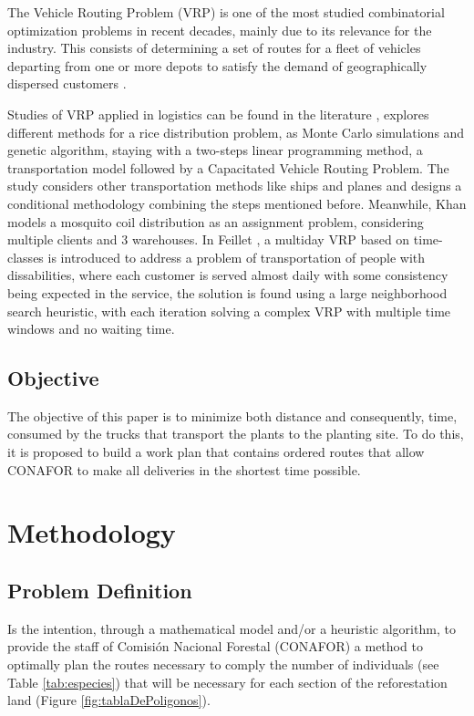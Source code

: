 \documentclass{amsart}
\begin{document}
         The Vehicle Routing Problem (VRP) is one of the most studied combinatorial optimization problems in recent decades, mainly due to its relevance for the industry. This consists of determining a set of routes for a fleet of vehicles departing from one or more depots to satisfy the demand of geographically dispersed customers \parencite{Sarmiento2014}.
         
         Studies of VRP applied in logistics can be found in the literature \parencite{Nurprihatin2021}, explores different methods for a rice distribution problem, as Monte Carlo simulations and genetic algorithm, staying with a two-steps linear programming method, a transportation model followed by a Capacitated Vehicle Routing Problem. The study considers other transportation methods like ships and planes and designs a conditional methodology combining the steps mentioned before. Meanwhile, Khan \parencite{Khan2014} models a mosquito coil distribution as an assignment problem, considering multiple clients and 3 warehouses. In Feillet \parencite{Feillet2014}, a multiday VRP based on time-classes is introduced to address a problem of transportation of people with dissabilities, where each customer is served almost daily with some consistency being expected in the service, the solution is found using a large neighborhood search heuristic, with each iteration solving a complex VRP with multiple time windows and no waiting time.
         

        \subsection{Objective}        
        The objective of this paper is to minimize both distance and consequently, time, consumed by the trucks that transport the plants to the planting site. To do this, it is proposed to build a work plan that contains ordered routes that allow CONAFOR to make all deliveries in the shortest time possible.
        




\section{Methodology}
    \subsection{Problem Definition}
    Is the intention, through a mathematical model and/or a heuristic algorithm, to provide the staff of Comisión Nacional Forestal (CONAFOR) a method to optimally plan the routes necessary to comply the number of individuals (see Table \ref{tab:especies}) that will be necessary for each section of the reforestation land (Figure \ref{fig:tablaDePoligonos}). 
\end{document}
